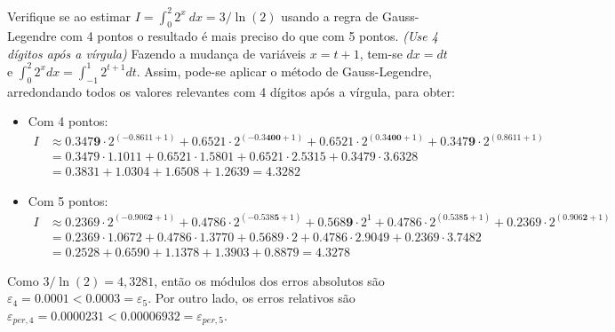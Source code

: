 \documentclass[12pt,a4paper]{article}
\begin{document}
\begin{ExerciseList}
\Exercise[title={2,5}]
Verifique se ao estimar $\displaystyle I = \int_0^2 2^x\ dx = 3/\ln(2)$ usando a regra de Gauss-Legendre com 4 pontos o resultado é mais preciso do que com 5 pontos. \textit{\footnotesize (Use 4 dígitos após a vírgula)}
\Answer
Fazendo a mudança de variáveis $x = t + 1$, tem-se $dx = dt$ e
$\int_0^2 2^x dx = \int_{-1}^1 2^{t+1} dt$.
Assim, pode-se aplicar o método de Gauss-Legendre, arredondando todos os valores relevantes com 4 dígitos após a vírgula, para obter:
\begin{itemize}
\item Com 4 pontos:
\begin{align*}
I & \approx
  0.347\textbf{9} \cdot 2^{(-0.8611 + 1)}
+ 0.6521 \cdot 2^{(-0.3\textbf{400} + 1)}
+ 0.6521 \cdot 2^{( 0.3\textbf{400} + 1)}
+ 0.347\textbf{9} \cdot 2^{( 0.8611 + 1)}\\
& =
  0.3479 \cdot 1.1011
+ 0.6521 \cdot 1.5801
+ 0.6521 \cdot 2.5315
+ 0.3479 \cdot 3.6328\\
& = 0.3831 + 1.0304 + 1.6508 + 1.2639 = 4.3282
\end{align*}
\item Com 5 pontos:
\begin{align*}
I & \approx
  0.2369 \cdot 2^{(-0.906\textbf{2} + 1)}
+ 0.4786 \cdot 2^{(-0.538\textbf{5} + 1)}
+ 0.568\textbf{9} \cdot 2^1
+ 0.4786 \cdot 2^{( 0.538\textbf{5} + 1)}
+ 0.2369 \cdot 2^{( 0.906\textbf{2} + 1)}\\
&=
  0.2369 \cdot 1.0672
+ 0.4786 \cdot 1.3770
+ 0.5689 \cdot 2
+ 0.4786 \cdot 2.9049
+ 0.2369 \cdot 3.7482\\
&= 0.2528 + 0.6590 + 1.1378 + 1.3903 + 0.8879 = 4.3278
\end{align*}
\end{itemize}
Como $3/\ln(2) = 4,3281$, então os módulos dos erros absolutos são $\varepsilon_4 = 0.0001 < 0.0003 = \varepsilon_5$. Por outro lado, os erros relativos são $\varepsilon_{per,4} = 0.0000231 < 0.00006932 = \varepsilon_{per,5}$.


\end{ExerciseList}
\end{document}
